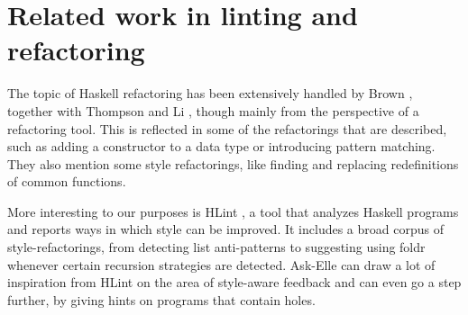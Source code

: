 \section{Related work in linting and refactoring}

The topic of Haskell refactoring has been extensively handled by Brown \cite{2008brown}, together with Thompson and Li \cite{2013thompson}, though mainly from the perspective of a refactoring tool. This is reflected in some of the refactorings that are described, such as adding a constructor to a data type or introducing pattern matching. They also mention some style refactorings, like finding and replacing redefinitions of common functions.

More interesting to our purposes is HLint \cite{HLint}, a tool that analyzes Haskell programs and reports ways in which style can be improved. It includes a broad corpus of style-refactorings, from detecting list anti-patterns to suggesting using foldr whenever certain recursion strategies are detected. Ask-Elle can draw a lot of inspiration from HLint on the area of style-aware feedback and can even go a step further, by giving hints on programs that contain holes.
